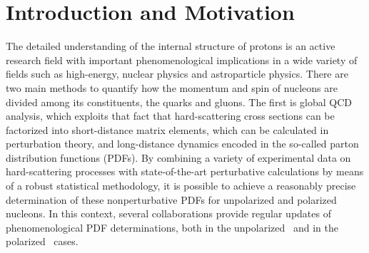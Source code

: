\section{Introduction and Motivation}

The detailed understanding of the internal structure of protons is an active
research field with important phenomenological implications in a wide variety of fields
such as high-energy, nuclear physics and astroparticle physics.
%
There are two main methods to quantify how the momentum and spin of nucleons
are divided among its constituents, the quarks and gluons.
%
The first is global QCD analysis, which exploits that fact that hard-scattering
cross sections can be factorized into short-distance matrix elements, which can
be calculated in perturbation theory, and long-distance dynamics encoded in the
so-called parton distribution functions (PDFs).
%
By combining a variety of experimental data on hard-scattering processes
with state-of-the-art perturbative calculations by means of a robust statistical
methodology, it is possible to achieve a reasonably precise determination
of these nonperturbative PDFs for unpolarized and polarized nucleons.
%
In this context, several collaborations provide regular updates of
phenomenological PDF determinations, both
in the unpolarized~\cite{Ball:2012cx,Ball:2014uwa,Harland-Lang:2014zoa,
Dulat:2015mca,Alekhin:2017kpj,Owens:2012bv} and in
the polarized~\cite{Nocera:2014gqa,deFlorian:2009vb} cases.

